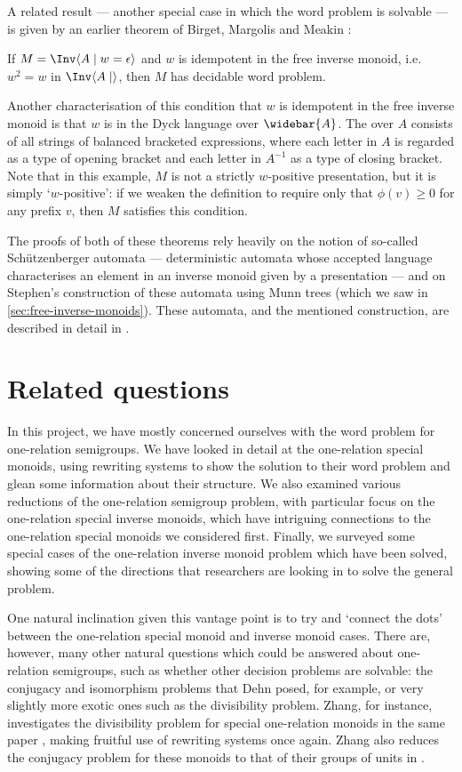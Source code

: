 \documentclass[noindex,noinsetproof,emphthm,12pt]{lmaths}
\newcommand{\Abar}{\widebar{A}}
\begin{document}
A related result --- another special case in which the word problem is solvable --- is given by an earlier theorem of Birget, Margolis and Meakin \cite{Birget1994}:
\begin{theorem}
	If $M = \Inv \langle A \mid w = \epsilon\rangle$ and $w$ is idempotent in the free inverse monoid, i.e. $w^2 = w$ in $\Inv \langle A \mid \rangle$, then $M$ has decidable word problem. \label{thm:idempotent-generated-WP-decidable}
\end{theorem}
Another characterisation of this condition that $w$ is idempotent in the free inverse monoid is that $w$ is in the Dyck language over $\Abar$. The  over $A$ consists of all strings of balanced bracketed expressions, where each letter in $A$ is regarded as a type of opening bracket and each letter in $A^{-1}$ as a type of closing bracket.
Note that in this example, $M$ is not a strictly $w$-positive presentation, but it is simply `$w$-positive': if we weaken the definition to require only that $\phi(v) \ge 0$ for any prefix $v$, then $M$ satisfies this condition.

The proofs of both of these theorems rely heavily on the notion of so-called Schützenberger automata --- deterministic automata whose accepted language characterises an element in an inverse monoid given by a presentation --- and on Stephen's construction of these automata using Munn trees (which we saw in \cref{sec:free-inverse-monoids}). These automata, and the mentioned construction, are described in detail in \cite{Stephen1990}.

\section{Related questions}
In this project, we have mostly concerned ourselves with the word problem for one-relation semigroups. We have looked in detail at the one-relation special monoids, using rewriting systems to show the solution to their word problem and glean some information about their structure. We also examined various reductions of the one-relation semigroup problem, with particular focus on the one-relation special inverse monoids, which have intriguing connections to the one-relation special monoids we considered first. Finally, we surveyed some special cases of the one-relation inverse monoid problem which have been solved, showing some of the directions that researchers are looking in to solve the general problem.

One natural inclination given this vantage point is to try and `connect the dots' between the one-relation special monoid and inverse monoid cases. There are, however, many other natural questions which could be answered about one-relation semigroups, such as whether other decision problems are solvable: the conjugacy and isomorphism problems that Dehn posed, for example, or very slightly more exotic ones such as the divisibility problem. Zhang, for instance, investigates the divisibility problem for special one-relation monoids in the same paper \cite{Zhang1992a}, making fruitful use of rewriting systems once again. Zhang also reduces the conjugacy problem for these monoids to that of their groups of units in \cite{Zhang1991}.
\end{document}
